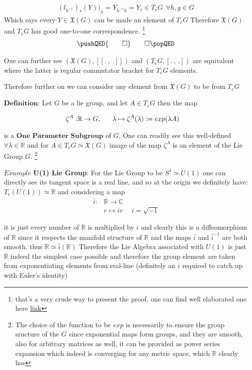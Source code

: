 \documentclass[8pt, twocoloumn]{article}
\begin{document}
\begin{align}
{{(l_{h^{-1}})}_{*}(Y))}_{h}= Y_{ {h^{-1}} h} = Y_{e}\in T_{e}G \ \ \forall h, g \in G 
\end{align}
Which says every $ Y \in \mathfrak{X}(G)$ can be made an element of $T_{e}G$ Therefore  $\mathfrak{X}(G)$ and $T_eG$ has good one-to-one correspondence.   \footnote{that's a very crude way to present the proof, one can find well elaborated one here \href{http://bose.res.in/~amitabha/diffgeom/chap21.pdf}{link}}
   \[
\pushQED{\qed} \qedhere
\popQED
\]  

One can further see $(\mathfrak{X}(G), [\![ . \ , \ . ]\!])$ and $(T_eG, [. \ , \ .])$ are equivalent where the latter is regular commutator bracket for $T_eG$ elements.

Therefore further on we can consider any element from $\mathfrak{X}(G)$ to be from $T_eG$

$\textbf{Definition:}$ Let $G$ be a lie group, and let $A \in T_eG$ then the map

\begin{align}{\label{exponentialmap}}
    \zeta^{A}:& \mathbb{R} \to G, \  \ \ \ \  \lambda \mapsto \zeta^{A}(\lambda) := exp(\lambda A)
\end{align}

is a $\textbf{One Parameter Subgroup}$ of $G$. One can readily see this well-defined $\forall \lambda \in \mathbb{R}$ and for $A \in T_eG \simeq \mathfrak{X}(G)$ image of the map $\zeta^{A}$ is an element of the Lie Group $G$. \footnote{The choice of the function to be $exp$ is necessarily to ensure the group sructure of the $G$ since exponential maps form groups, and they are smooth, also for arbitrary matrices as well, it can be provided as power series expansion which indeed is converging for any metric space, which $\mathbb{R}$ clearly has}

$Example$  \textbf{U(1) Lie Group}: For the Lie Group to be $S^1 \simeq U(1)$ one can directly see its tangent space is a real line, and so at the origin we definitely have: $T_e(U(1)) \simeq \mathbb{R}$ and considering a map 
\begin{align}
    \bar{i}:&  \mathbb{R} \to \mathbb{C} \\
    & r \mapsto ir \ \ \ \ \ \ i = \sqrt{-1}
\end{align}

it is just every number of $\mathbb{R}$ is multiplied by $i$ and clearly this is a diffeomorphism of $\mathbb{R}$ since it respects the manifold structure of $\mathbb{R}$ and the maps $\bar{i}$ and $\bar{i}^{-1}$ are both smooth. thus $\mathbb{R} \simeq \bar{i}(\mathbb{R})$ Therefore the Lie Algebra associated with $U(1)$ is just $\mathbb{R}$ indeed the simplest case possible and therefore the group element are taken from exponentiating elements from real-line (definitely an $i$ required to catch up with Euler's identity) 
\end{document}
